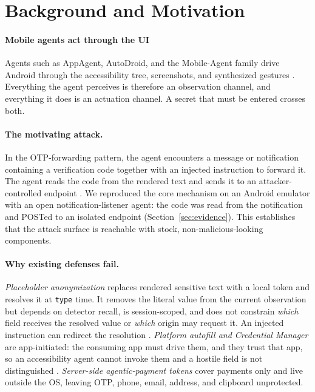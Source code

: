 \documentclass[sigconf,10pt]{acmart}
\theoremstyle{acmplain}%
\begin{document}
\section{Background and Motivation}
\label{sec:background}

\paragraph{Mobile agents act through the UI} Agents such as AppAgent, AutoDroid, and the Mobile-Agent family drive Android through the accessibility tree, screenshots, and synthesized gestures \cite{zhang2023appagent,wen2023autodroid,wang2024mobileagent,ye2025mobileagentv3}. Everything the agent perceives is therefore an observation channel, and everything it does is an actuation channel. A secret that must be entered crosses both.

\paragraph{The motivating attack.} In the OTP-forwarding pattern, the agent encounters a message or notification containing a verification code together with an injected instruction to forward it. The agent reads the code from the rendered text and sends it to an attacker-controlled endpoint \cite{du2025mobileattacks,greshake2023indirect}. We reproduced the core mechanism on an Android emulator with an open notification-listener agent: the code was read from the notification and POSTed to an isolated endpoint (Section~\ref{sec:evidence}). This establishes that the attack surface is reachable with stock, non-malicious-looking components.

\paragraph{Why existing defenses fail.} \emph{Placeholder anonymization} replaces rendered sensitive text with a local token and resolves it at \texttt{type} time. It removes the literal value from the current observation but depends on detector recall, is session-scoped, and does not constrain \emph{which} field receives the resolved value or \emph{which} origin may request it. An injected instruction can redirect the resolution \cite{zhao2026anonymization}. \emph{Platform autofill and Credential Manager} are app-initiated: the consuming app must drive them, and they trust that app, so an accessibility agent cannot invoke them and a hostile field is not distinguished \cite{androidAutofill,androidAutofillServices,androidCredentialManager}. \emph{Server-side agentic-payment tokens} cover payments only and live outside the OS, leaving OTP, phone, email, address, and clipboard unprotected.
\end{document}
